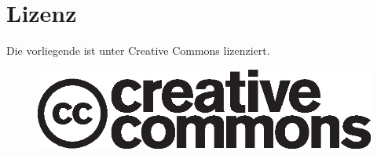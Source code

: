 \chapter*{Lizenz}

Die vorliegende \thesisDesignator{} \textbf{\thesisTitle{}} ist unter Creative Commons  lizenziert.
\vspace{0.5\textheight}
\begin{figure}[h]
    \centering
    \includegraphics[width=0.5\linewidth]{resources/cc_logo}
    \label{fig:cc_logo}
\end{figure}
